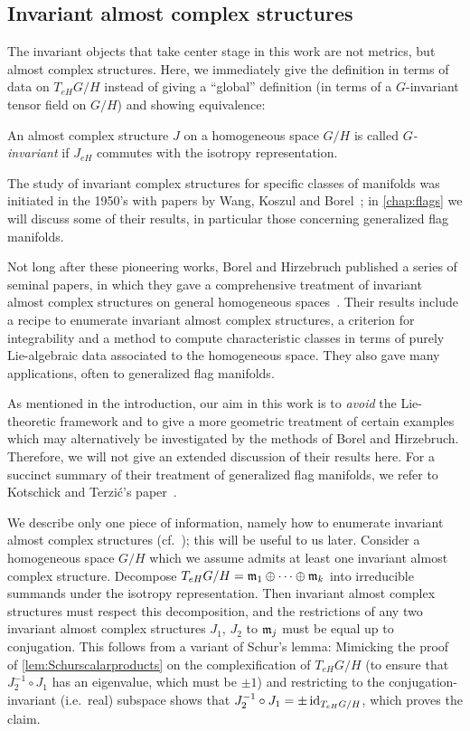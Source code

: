 \subsection{Invariant almost complex structures}

The invariant objects that take center stage in this work are not metrics, but almost complex structures. Here, we immediately give the definition in terms of data on $T_{eH}G/H$ instead of giving a ``global'' definition (in terms of a $G$-invariant tensor field on $G/H$) and showing equivalence:

\begin{mydef}
	An almost complex structure $J$ on a homogeneous space $G/H$ is called \emph{$G$-invariant} if $J_{eH}$ commutes with the isotropy representation.
\end{mydef}

The study of invariant complex structures for specific classes of manifolds was initiated in the 1950's with papers by Wang, Koszul and Borel~\cite{Wan1954,Kos1955,Bor1954}; in \cref{chap:flags} we will discuss some of their results, in particular those concerning generalized flag manifolds.

Not long after these pioneering works, Borel and Hirzebruch published a series of seminal papers, in which they gave a comprehensive treatment of invariant almost complex structures on general homogeneous spaces~\cite{BH1958a}. Their results include a recipe to enumerate invariant almost complex structures, a criterion for integrability and a method to compute characteristic classes in terms of purely Lie-algebraic data associated to the homogeneous space. They also gave many applications, often to generalized flag manifolds.

As mentioned in the introduction, our aim in this work is to \emph{avoid} the Lie-theoretic framework and to give a more geometric treatment of certain examples which may alternatively be investigated by the methods of Borel and Hirzebruch. Therefore, we will not give an extended discussion of their results here. For a succinct summary of their treatment of generalized flag manifolds, we refer to Kotschick and Terzi\'c's paper~\cite[Sec.~2]{KT2009}. 

We describe only one piece of information, namely how to enumerate invariant almost complex structures (cf.~\cite[\S 13.4--5]{BH1958a}); this will be useful to us later. Consider a homogeneous space $G/H$ which we assume admits at least one invariant almost complex structure. Decompose $T_{eH}G/H=\mathfrak{m}_1\oplus\dots \oplus \mathfrak{m}_k$ into irreducible summands under the isotropy representation. Then invariant almost complex structures must respect this decomposition, and the restrictions of any two invariant almost complex structures $J_1$, $J_2$ to $\mathfrak{m}_j$ must be equal up to conjugation. This follows from a variant of Schur's lemma: Mimicking the proof of \cref{lem:Schurscalarproducts} on the complexification of $T_{eH}G/H$ (to ensure that $J_2^{-1}\circ J_1$ has an eigenvalue, which must be $\pm 1$) and restricting to the conjugation-invariant (i.e.~real) subspace shows that $J_2^{-1}\circ J_1=\pm \operatorname{id}_{T_{eH}G/H}$, which proves the claim. 

